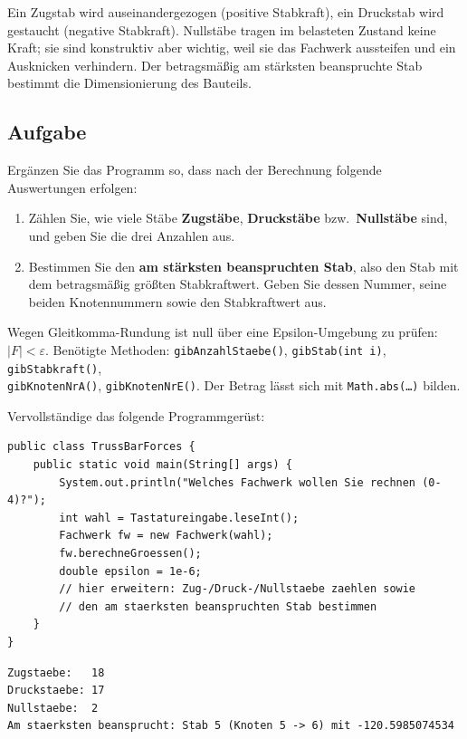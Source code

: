 \documentclass[
	fontsize=12pt,          %
	paper=a4,               %
	numbers=noenddot,       %
	listof=totoc,           %
	listof=entryprefix,     %
	listof=nochaptergap,    %
	bibliography=totoc,     %
	parskip=half            %
	openany                 %
]{scrbook}
\begin{document}
\begin{hinweis}
	Ein Zugstab wird auseinandergezogen (positive Stabkraft), ein Druckstab wird gestaucht (negative Stabkraft).
	Nullstäbe tragen im belasteten Zustand keine Kraft; sie sind konstruktiv aber wichtig, weil sie das Fachwerk aussteifen und ein Ausknicken verhindern.
	Der betragsmäßig am stärksten beanspruchte Stab bestimmt die Dimensionierung des Bauteils.
\end{hinweis}

\subsection*{Aufgabe}

Ergänzen Sie das Programm so, dass nach der Berechnung folgende Auswertungen erfolgen:

\begin{enumerate}[label=\textbf{\arabic*.)}]
	\item Zählen Sie, wie viele Stäbe \textbf{Zugstäbe}, \textbf{Druckstäbe} bzw.\ \textbf{Nullstäbe} sind, und geben Sie die drei Anzahlen aus.

	\item Bestimmen Sie den \textbf{am stärksten beanspruchten Stab}, also den Stab mit dem betragsmäßig größten Stabkraftwert.
	Geben Sie dessen Nummer, seine beiden Knotennummern sowie den Stabkraftwert aus.
\end{enumerate}

\begin{hinweis}
	Wegen Gleitkomma-Rundung ist \glqq null\grqq{} über eine Epsilon-Umgebung zu prüfen: $|F| < \varepsilon$.
	Benötigte Methoden: \texttt{gibAnzahlStaebe()}, \texttt{gibStab(int i)}, \texttt{gibStabkraft()},\\ \texttt{gibKnotenNrA()}, \texttt{gibKnotenNrE()}.
	Der Betrag lässt sich mit \texttt{Math.abs(\dots)} bilden.
\end{hinweis}

\medskip
Vervollständige das folgende Programmgerüst:

\begin{lstlisting}
public class TrussBarForces {
    public static void main(String[] args) {
        System.out.println("Welches Fachwerk wollen Sie rechnen (0-4)?");
        int wahl = Tastatureingabe.leseInt();
        Fachwerk fw = new Fachwerk(wahl);
        fw.berechneGroessen();
        double epsilon = 1e-6;
        // hier erweitern: Zug-/Druck-/Nullstaebe zaehlen sowie
        // den am staerksten beanspruchten Stab bestimmen
    }
}
\end{lstlisting}

\begin{beispiel}
\begin{lstlisting}[language={}]
Zugstaebe:   18
Druckstaebe: 17
Nullstaebe:  2
Am staerksten beansprucht: Stab 5 (Knoten 5 -> 6) mit -120.5985074534
\end{lstlisting}
\end{beispiel}
\end{document}
